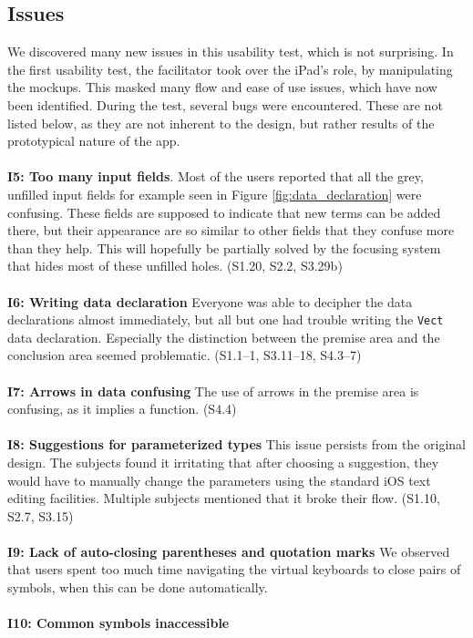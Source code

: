 \subsection{Issues}
\label{sec:second_issues}
We discovered many new issues in this usability test, which is not
surprising. In the first usability test, the facilitator took over the iPad's role, by
manipulating the mockups. This masked many flow and ease of use issues, which
have now been identified. During the test, several bugs were encountered. These
are not listed below, as they are not inherent to the design, but rather
results of the prototypical nature of the app.
\\ \\
\textbf{I5: Too many input fields}.
Most of the users reported that all the grey, unfilled input fields for example seen in Figure \ref{fig:data_declaration} were
confusing. These fields are supposed to indicate that new terms can be added
there, but their appearance are so similar to other fields that they confuse
more than they help.
This will hopefully be partially solved by the focusing system that hides most of these unfilled holes. (S1.20, S2.2, S3.29b)
\\ \\
\textbf{I6: Writing data declaration}
Everyone was able to decipher the data declarations almost immediately, but
all but one had trouble writing the \texttt{Vect} data declaration. Especially
the distinction between the premise area and the conclusion area seemed
problematic. (S1.1--1, S3.11--18, S4.3--7)
\\ \\
\textbf{I7: Arrows in data confusing}
The use of arrows in the premise area is confusing, as it implies a function. 
(S4.4)
\\ \\
\textbf{I8: Suggestions for parameterized types}
This issue persists from the original design. The subjects found it irritating
that after choosing a suggestion, they would have to manually change the
parameters using the standard iOS text editing facilities. Multiple subjects
mentioned that it broke their flow. (S1.10, S2.7, S3.15)
\\ \\
\textbf{I9: Lack of auto-closing parentheses and quotation marks}
We observed that users spent too much time navigating the virtual keyboards to
close pairs of symbols, when this can be done automatically.
\\ \\
\textbf{I10: Common symbols inaccessible}
